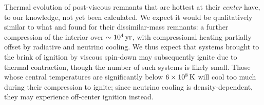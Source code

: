 
Thermal evolution of post-viscous remnants that are hottest at their \textit{center} have, to our knowledge, not yet been calculated.  We expect it would be qualitatively similar to what \cite{shen+12} and \cite{schw+16} found for their dissimilar-mass remnants: a further compression of the interior over $\sim10^4\,\mathrm{yr}$, with compressional heating partially offset by radiative and neutrino cooling.  We thus expect that systems brought to the brink of ignition by viscous spin-down may subsequently ignite due to thermal contraction, though the number of such systems is likely small.  Those whose central temperatures are significantly below $6\times10^8\,\mathrm{K}$ will cool too much during their compression to ignite; since neutrino cooling is density-dependent, they may experience off-center ignition instead.
